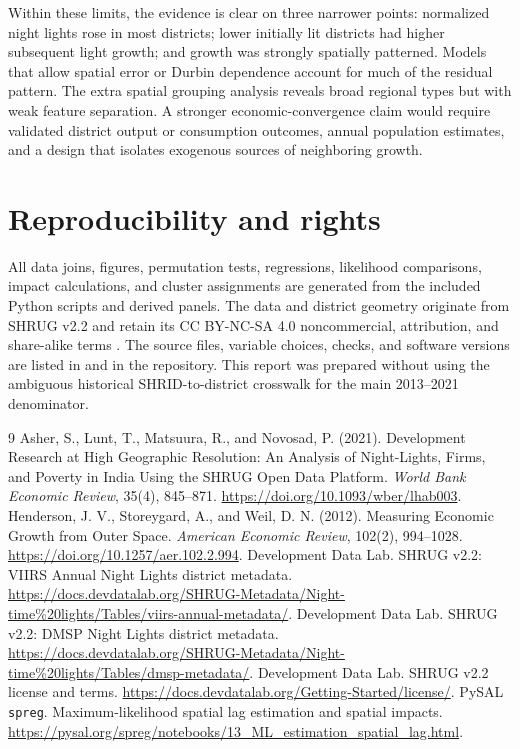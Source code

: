\documentclass[11pt,a4paper]{article}
\begin{document}
Within these limits, the evidence is clear on three narrower points: normalized night lights rose in most districts; lower initially lit districts had higher subsequent light growth; and growth was strongly spatially patterned. Models that allow spatial error or Durbin dependence account for much of the residual pattern. The extra spatial grouping analysis reveals broad regional types but with weak feature separation. A stronger economic-convergence claim would require validated district output or consumption outcomes, annual population estimates, and a design that isolates exogenous sources of neighboring growth.

\section*{Reproducibility and rights}
All data joins, figures, permutation tests, regressions, likelihood comparisons, impact calculations, and cluster assignments are generated from the included Python scripts and derived panels. The data and district geometry originate from SHRUG v2.2 and retain its CC BY-NC-SA 4.0 noncommercial, attribution, and share-alike terms \cite{shruglicense}. The source files, variable choices, checks, and software versions are listed in  and  in the repository. This report was prepared without using the ambiguous historical SHRID-to-district crosswalk for the main 2013--2021 denominator.

\begin{thebibliography}{9}
 Asher, S., Lunt, T., Matsuura, R., and Novosad, P. (2021). Development Research at High Geographic Resolution: An Analysis of Night-Lights, Firms, and Poverty in India Using the SHRUG Open Data Platform. \emph{World Bank Economic Review}, 35(4), 845--871. \url{https://doi.org/10.1093/wber/lhab003}.
 Henderson, J. V., Storeygard, A., and Weil, D. N. (2012). Measuring Economic Growth from Outer Space. \emph{American Economic Review}, 102(2), 994--1028. \url{https://doi.org/10.1257/aer.102.2.994}.
 Development Data Lab. SHRUG v2.2: VIIRS Annual Night Lights district metadata. \url{https://docs.devdatalab.org/SHRUG-Metadata/Night-time\%20lights/Tables/viirs-annual-metadata/}.
 Development Data Lab. SHRUG v2.2: DMSP Night Lights district metadata. \url{https://docs.devdatalab.org/SHRUG-Metadata/Night-time\%20lights/Tables/dmsp-metadata/}.
 Development Data Lab. SHRUG v2.2 license and terms. \url{https://docs.devdatalab.org/Getting-Started/license/}.
 PySAL \texttt{spreg}. Maximum-likelihood spatial lag estimation and spatial impacts. \url{https://pysal.org/spreg/notebooks/13_ML_estimation_spatial_lag.html}.
\end{thebibliography}
\end{document}
